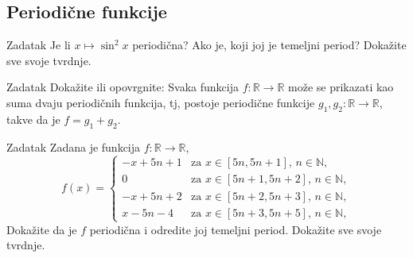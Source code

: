 \subsection*{Periodične funkcije}
\begin{exercise}{Zadatak}
Je li \(x\mapsto \sin^2{x}\) periodična? Ako je, koji joj je temeljni period? Dokažite sve svoje tvrdnje.
\end{exercise}
\begin{exercise}{Zadatak}
Dokažite ili opovrgnite: Svaka funkcija $f : \mathbb{R}\to \mathbb{R}$ može se prikazati kao suma dvaju periodičnih funkcija, tj, postoje periodične funkcije $g_1, g_2 : \mathbb{R}\to \mathbb{R}$, takve da je $f=g_1+g_2$.
\end{exercise}
\begin{exercise}{Zadatak}
Zadana je funkcija \(f : \mathbb{R}\to \mathbb{R}\),
\[f(x)=\begin{cases}
-x+5n+1 & \text{za } x\in [5n, 5n+1],\, n\in \mathbb{N},\\
0 & \text{za } x\in [5n+1, 5n+2],\, n\in \mathbb{N},\\
-x+5n+2 & \text{za } x\in [5n+2, 5n+3],\, n\in \mathbb{N},\\
x-5n-4 & \text{za } x\in [5n+3, 5n+5],\, n\in \mathbb{N},
\end{cases}\]
Dokažite da je \(f\) periodična i odredite joj temeljni period. Dokažite sve svoje tvrdnje.
\end{exercise}